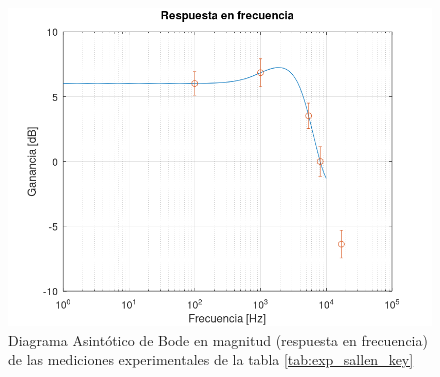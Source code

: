             \begin{figure}[H]
                \centering
                \renewcommand{\figurename}{Gráfica}
                \setcounter{figure}{40}
                \includegraphics[width=15cm]{Imagenes/resp_frec_sallen_key.png}
                \caption{Diagrama  Asintótico de Bode en magnitud (respuesta en frecuencia) de las mediciones experimentales de la tabla \ref{tab:exp_sallen_key}}
                \label{fig:resp_frec_sallen_key}
            \end{figure}

